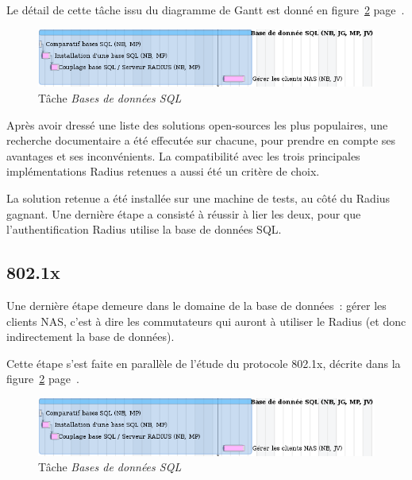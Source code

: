 Le détail de cette tâche issu du diagramme de Gantt est donné en figure~\ref{gantt_sql} page~\pageref{gantt_sql}.

\begin{figure}[!h]
	\label{gantt_sql}
	\begin{center}
		\includegraphics[width=350pt]{img/gantt_sql.png}
	\end{center}
	\caption{Tâche \textit{Bases de données SQL}}
\end{figure}

Après avoir dressé une liste des solutions open-sources les plus populaires, une recherche documentaire a été effecutée sur chacune, pour prendre en compte ses avantages et ses inconvénients. La compatibilité avec les trois principales implémentations Radius retenues a aussi été un critère de choix.

La solution retenue a été installée sur une machine de tests, au côté du Radius gagnant. Une dernière étape a consisté à réussir à lier les deux, pour que l'authentification Radius utilise la base de données SQL.

\subsection{802.1x}

Une dernière étape demeure dans le domaine de la base de données~: gérer les clients NAS, c'est à dire les commutateurs qui auront à utiliser le Radius (et donc indirectement la base de données).

Cette étape s'est faite en parallèle de l'étude du protocole 802.1x, décrite dans la figure~\ref{gantt_sql} page~\pageref{gantt_sql}.

\begin{figure}[!h]
	\label{gantt_sql}
	\begin{center}
		\includegraphics[width=350pt]{img/gantt_sql.png}
	\end{center}
	\caption{Tâche \textit{Bases de données SQL}}
\end{figure}


